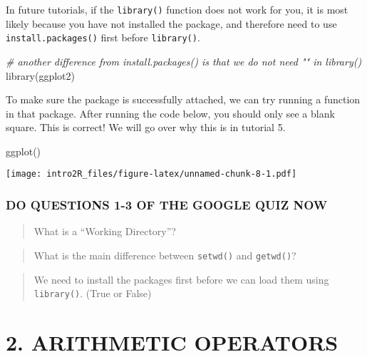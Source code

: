 \documentclass[
]{book}
\newenvironment{Shaded}{\begin{snugshade}}{\end{snugshade}}
\newcommand{\CommentTok}[1]{\textcolor[rgb]{0.56,0.35,0.01}{\textit{#1}}}
\newcommand{\FunctionTok}[1]{\textcolor[rgb]{0.00,0.00,0.00}{#1}}
\newcommand{\NormalTok}[1]{#1}
\begin{document}
In future tutorials, if the \texttt{library()} function does not work for you, it is most likely because you have not installed the package, and therefore need to use \texttt{install.packages()} first before \texttt{library()}.

\begin{Shaded}
\begin{Highlighting}[]
\CommentTok{\# another difference from install.packages() is that we do not need "" in library()}
\FunctionTok{library}\NormalTok{(ggplot2)}
\end{Highlighting}
\end{Shaded}

To make sure the package is successfully attached, we can try running a function in that package. After running the code below, you should only see a blank square. This is correct! We will go over why this is in tutorial 5.

\begin{Shaded}
\begin{Highlighting}[]
\FunctionTok{ggplot}\NormalTok{()}
\end{Highlighting}
\end{Shaded}

\texttt{[image: intro2R\_files/figure-latex/unnamed-chunk-8-1.pdf]}

\hypertarget{do-questions-1-3-of-the-google-quiz-now}{%
\subsubsection{DO QUESTIONS 1-3 OF THE GOOGLE QUIZ NOW}\label{do-questions-1-3-of-the-google-quiz-now}}

\begin{quote}
What is a ``Working Directory''?
\end{quote}

\begin{quote}
What is the main difference between \texttt{setwd()} and \texttt{getwd()}?
\end{quote}

\begin{quote}
We need to install the packages first before we can load them using \texttt{library()}. (True or False)
\end{quote}

\hypertarget{arithmetic-operators}{%
\section{2. ARITHMETIC OPERATORS}\label{arithmetic-operators}}
\end{document}

